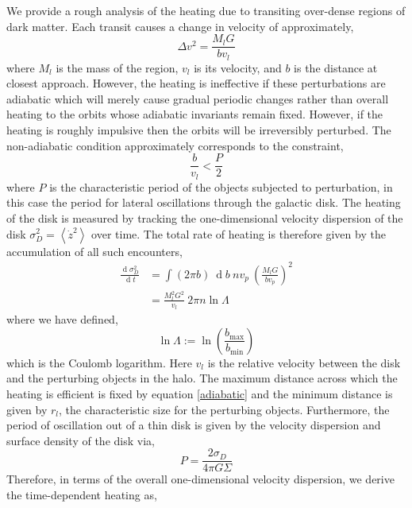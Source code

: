 \documentclass[usenatbib]{mnras}
\renewcommand{\d}[1]{\! \mathrm{d}#1 \:}
\newcommand{\deriv}[2]{\frac{\d{#1}}{\d{#2}}}
\renewcommand{\d}[1]{\ensuremath{\operatorname{d}\!{#1}}}
\begin{document}
We provide a rough analysis of the heating due to transiting over-dense regions of dark matter. Each transit causes a change in velocity of approximately,
\begin{equation}
\Delta v^2 = \frac{M_l G}{b v_l}
\end{equation}
where $M_l$ is the mass of the region, $v_l$ is its velocity, and $b$ is the distance at closest approach. However, the heating is ineffective if these perturbations are adiabatic which will merely cause gradual periodic changes rather than overall heating to the orbits whose adiabatic invariants remain fixed. However, if the heating is roughly impulsive then the orbits will be irreversibly perturbed. The non-adiabatic condition approximately corresponds to the constraint,
\begin{equation} \label{adiabatic}
\frac{b}{v_l} < \frac{P}{2}
\end{equation}
where $P$ is the characteristic period of the objects subjected to perturbation, in this case the period for lateral oscillations through the galactic disk. The heating of the disk is measured by tracking the one-dimensional velocity dispersion of the disk $\sigma_D^2 = \left< \dot{z}^2 \right>$ over time. The total rate of heating is therefore given by the accumulation of all such encounters,
\begin{subequations}
\begin{align}
\deriv{\sigma_D^2}{t} &= \int (2 \pi b) \: \d{b} \: n v_p \: \left( \frac{M_l G}{b v_p} \right)^2 
\\
& = \frac{M_l^2 G^2}{v_l} \: 2 \pi n \ln{\Lambda}
\end{align}
\end{subequations}
where we have defined,
\begin{equation}
\ln{\Lambda} := \ln{\left( \frac{b_{\text{max}}}{b_{\text{min}}} \right)}
\end{equation}
which is the Coulomb logarithm. Here $v_l$ is the relative velocity between the disk and the perturbing objects in the halo. 
The maximum distance across which the heating is efficient is fixed by equation \eqref{adiabatic} and the minimum distance is given by $r_l$, the characteristic size for the perturbing objects. Furthermore, the period of oscillation out of a thin disk is given by the velocity dispersion and surface density of the disk via,
\begin{equation}
P = \frac{2 \sigma_D}{4 \pi G \Sigma}
\end{equation} 
Therefore, in terms of the overall one-dimensional velocity dispersion, we derive the time-dependent heating as,
\end{document}
